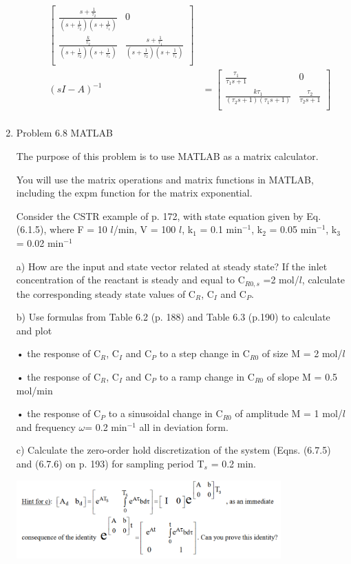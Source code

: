 \documentclass[12pt]{article}
\begin{document}
\begin{enumerate}
\begin{enumerate}
\begin{align*}
\begin{bmatrix}
            \frac{s + \frac{1}{\tau_2}}{\left(s + \frac{1}{\tau_2}\right) \left(s + \frac{1}{\tau_1}\right)} & 0 \\
            \frac{\frac{k}{\tau_2}}{\left(s + \frac{1}{\tau_2}\right) \left(s + \frac{1}{\tau_1}\right)} & \frac{s + \frac{1}{\tau_1}}{\left(s + \frac{1}{\tau_2}\right) \left(s + \frac{1}{\tau_1}\right)} \\
        \end{bmatrix} \\
        (sI - A)^{-1} &= 
        \begin{bmatrix}
            \frac{\tau_1}{\tau_1 s + 1} & 0 \\
            \frac{k \tau_1}{\left(\tau_2 s + 1\right) \left(\tau_1 s + 1\right)} & \frac{\tau_2}{\tau_2 s + 1} \\
        \end{bmatrix} \\
    \end{align*}
\end{enumerate}


\newpage
\item Problem 6.8 MATLAB

The purpose of this problem is to use MATLAB as a matrix calculator.

You will use the matrix operations and matrix functions in MATLAB, including the expm function for the matrix exponential.

Consider the CSTR example of p. 172, with state equation given by Eq. (6.1.5), where F = 10 $l$/min, V = 100 $l$, k$_1$ = 0.1 min$^{-1}$, k$_2$ = 0.05 min$^{-1}$, k$_3$ = 0.02 min$^{-1}$

a) How are the input and state vector related at steady state? If the inlet concentration of the reactant is steady and equal to C$_{R0,s}$ =2 mol/$l$, calculate the corresponding steady state values of C$_R$, C$_I$ and C$_P$.

b) Use formulas from Table 6.2 (p. 188) and Table 6.3 (p.190) to calculate and plot

• the response of C$_R$, C$_I$ and C$_P$ to a step change in C$_{R0}$ of size M = 2 mol/$l$

• the response of C$_R$, C$_I$ and C$_P$ to a ramp change in C$_{R0}$ of slope M = 0.5 mol/min

• the response of C$_P$ to a sinusoidal change in C$_{R0}$ of amplitude M = 1 mol/$l$ and frequency $\omega$= 0.2 min$^{-1}$ all in deviation form.

c) Calculate the zero-order hold discretization of the system (Eqns. (6.7.5) and (6.7.6) on p. 193) for sampling period T$_s$ = 0.2 min.

\includegraphics[width=0.8\textwidth]{assets/p4hint.png}

\end{enumerate}
\end{document}

